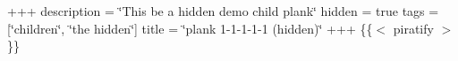 +++ description = \char`\"{}\+This be a hidden demo child plank\char`\"{} hidden = true tags = \mbox{[}\char`\"{}children\char`\"{}, \char`\"{}the hidden\char`\"{}\mbox{]} title = \char`\"{}plank 1-\/1-\/1-\/1-\/1 (hidden)\char`\"{} +++ \{\{$<$ piratify $>$\}\} 